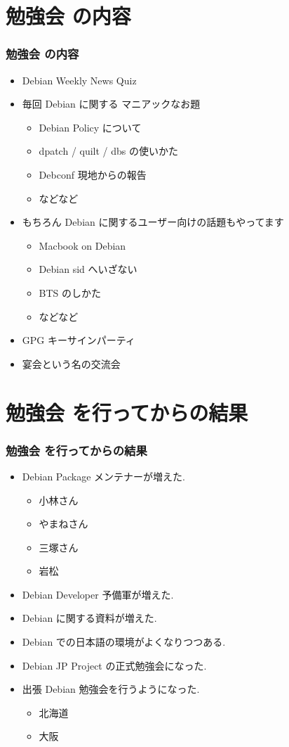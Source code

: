 \documentclass[cjk,dvipdfmx]{beamer}
\begin{document}
\section{勉強会 の内容}
\begin{frame}
 \frametitle{勉強会 の内容}
\begin{itemize}
  \item<1-> Debian Weekly News Quiz
  \item<2-> 毎回 Debian に関する マニアックなお題
    \begin{itemize}
	\item Debian Policy について
	\item dpatch / quilt / dbs の使いかた
	\item Debconf 現地からの報告
	\item などなど
    \end{itemize}
  \item<3-> もちろん Debian に関するユーザー向けの話題もやってます
    \begin{itemize}
	\item Macbook on Debian
	\item Debian sid へいざない
	\item BTS のしかた
	\item などなど
    \end{itemize}
  \item<4-> GPG キーサインパーティ
  \item<5-> 宴会という名の交流会
\end{itemize}
\end{frame}

\section{勉強会 を行ってからの結果}
\begin{frame}
 \frametitle{勉強会 を行ってからの結果}
\begin{itemize}
  \item<1-> Debian Package メンテナーが増えた.
    \begin{itemize}
	\item 小林さん
	\item やまねさん
	\item 三塚さん
	\item 岩松
    \end{itemize}	
  \item<2-> Debian Developer 予備軍が増えた.
  \item<3-> Debian に関する資料が増えた.
  \item<4-> Debian での日本語の環境がよくなりつつある.
  \item<5-> Debian JP Project の正式勉強会になった.
  \item<6-> 出張 Debian 勉強会を行うようになった.
    \begin{itemize}
	\item 北海道
	\item 大阪
    \end{itemize}	
\end{itemize}
\end{frame}
\end{document}
